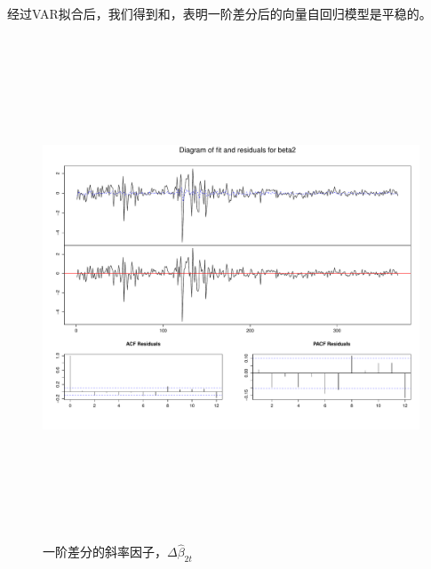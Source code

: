 经过VAR拟合后，我们得到和，表明一阶差分后的向量自回归模型是平稳的。
       \begin{figure}%
    \includegraphics[width=15cm,height=15cm]{figures/Rplot13}
   \caption{一阶差分的斜率因子，$\Delta\hat{\beta}_{2t}$}
   \label{Rplot13}
  \end{figure}
